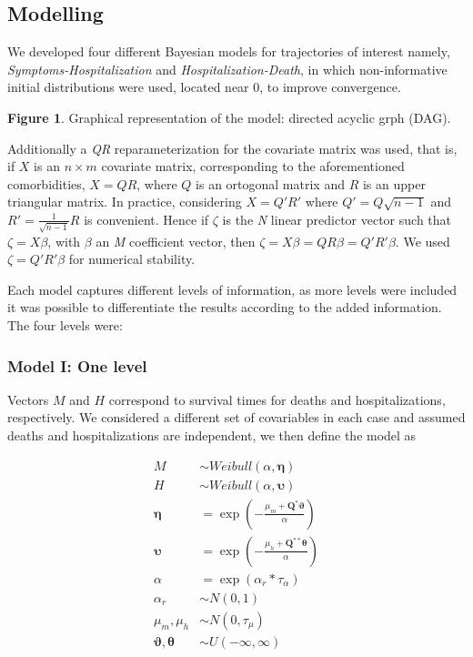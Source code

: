 \documentclass[10pt,letterpaper]{article}
\begin{document}
\subsection{Modelling}\label{modelling}

We developed four different Bayesian models for trajectories of interest
namely, \emph{Symptoms-Hospitalization} and
\emph{Hospitalization-Death}, in which non-informative initial
distributions were used, located near \(0\), to improve convergence.

\textbf{Figure 1}. Graphical representation of the model: directed
acyclic grph (DAG).

Additionally a \textit{QR} reparameterization for the covariate matrix
was used, that is, if \(X\) is an \(n \times m\) covariate matrix,
corresponding to the aforementioned comorbidities, \(X=QR\), where \(Q\)
is an ortogonal matrix and \(R\) is an upper triangular matrix. In
practice, considering \(X=Q'R'\) where \(Q'=Q\sqrt{n-1}\) and
\(R'=\frac{1}{\sqrt{n-1}}R\) is convenient. Hence if \(\zeta\) is the
\textit{N} linear predictor vector such that \(\zeta=X\beta\), with
\(\beta\) an \textit{M} coefficient vector, then
\(\zeta=X\beta=QR\beta=Q'R'\beta\). We used \(\zeta=Q'R'\beta\) for
numerical stability.

Each model captures different levels of information, as more levels were
included it was possible to differentiate the results according to the
added information. The four levels were:

\subsubsection{Model I: One level}\label{model-i-one-level}

Vectors \(M\) and \(H\) correspond to survival times for deaths and
hospitalizations, respectively. We considered a different set of
covariables in each case and assumed deaths and hospitalizations are
independent, we then define the model as

\[
\begin{aligned}
 {M}  &\sim Weibull(\alpha,\mathbf{\eta})\\
 {H}  &\sim Weibull(\alpha,\mathbf{\upsilon}) \\
 \mathbf{\eta} &= \exp\left(-\frac{\mu_m+\mathbf{Q}^*\mathbf{\vartheta}}{\alpha}\right) \\
 \mathbf{\upsilon} &= \exp\left(-\frac{\mu_h+\mathbf{Q}^{**}\mathbf{\theta}}{\alpha}\right) \\
 \alpha&=\exp(\alpha_r*\tau_\alpha) \\
 \alpha_r&\sim N(0,1) \\
 \mu_m,\mu_h &\sim N(0,\tau_\mu) \\
 \mathbf{\vartheta},\mathbf{\theta} &\sim U(-\infty,\infty) \\
\end{aligned}
\]
\end{document}
